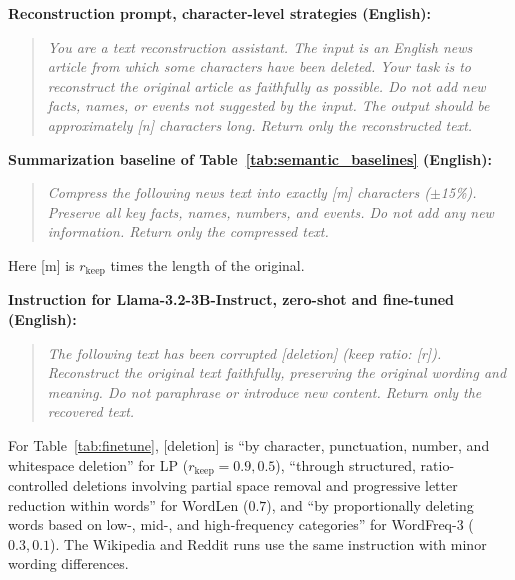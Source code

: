 \documentclass[11pt]{article}
\newcommand{\rkeep}{r_{\mathrm{keep}}}
\begin{document}
\textbf{Reconstruction prompt, character-level strategies (English):}
\begin{quote}
\textit{You are a text reconstruction assistant. The input is an English news article from which some
characters have been deleted. Your task is to reconstruct the original article as faithfully as possible.
Do not add new facts, names, or events not suggested by the input. The output should be approximately
\textup{[n]} characters long. Return only the reconstructed text.}
\end{quote}

\textbf{Summarization baseline of Table~\ref{tab:semantic_baselines} (English):}
\begin{quote}
\textit{Compress the following news text into exactly \textup{[m]} characters ($\pm$15\%). Preserve all key
facts, names, numbers, and events. Do not add any new information. Return only the compressed text.}
\end{quote}
\noindent Here \textup{[m]} is $\rkeep$ times the length of the original.

\textbf{Instruction for Llama-3.2-3B-Instruct, zero-shot and fine-tuned (English):}
\begin{quote}
\textit{The following text has been corrupted \textup{[deletion]} (keep ratio: \textup{[r]}). Reconstruct the
original text faithfully, preserving the original wording and meaning. Do not paraphrase or introduce new
content. Return only the recovered text.}
\end{quote}
\noindent For Table~\ref{tab:finetune}, \textup{[deletion]} is ``by character, punctuation, number, and whitespace
deletion'' for LP ($\rkeep = 0.9, 0.5$), ``through structured, ratio-controlled deletions involving partial space
removal and progressive letter reduction within words'' for WordLen ($0.7$), and ``by proportionally deleting words
based on low-, mid-, and high-frequency categories'' for WordFreq-3 ($0.3, 0.1$). The Wikipedia and Reddit runs
use the same instruction with minor wording differences.
\end{document}
